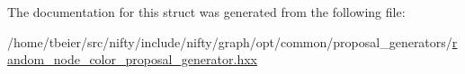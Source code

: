 The documentation for this struct was generated from the following file\+:\begin{DoxyCompactItemize}
\item 
/home/tbeier/src/nifty/include/nifty/graph/opt/common/proposal\+\_\+generators/\hyperlink{random__node__color__proposal__generator_8hxx}{random\+\_\+node\+\_\+color\+\_\+proposal\+\_\+generator.\+hxx}\end{DoxyCompactItemize}
